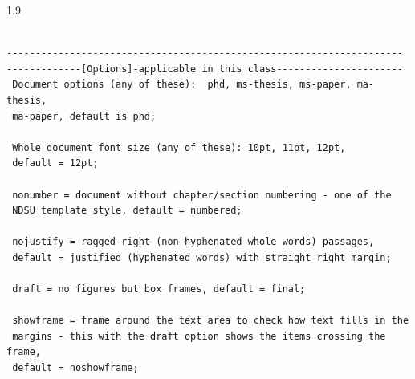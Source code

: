 \documentclass[phd]{ndsu-thesis-2022}
\newcommand\myspacing{1.9} %
\begin{document}
\begin{spacing}{\myspacing}
\begin{lstlisting}[basicstyle=\ttfamily\footnotesize\color{blue}] %or \small or \footnotesize etc.

---------------------------------------------------------------------
-------------[Options]-applicable in this class----------------------
 Document options (any of these):  phd, ms-thesis, ms-paper, ma-thesis, 
 ma-paper, default is phd; 
 
 Whole document font size (any of these): 10pt, 11pt, 12pt, 
 default = 12pt; 
 
 nonumber = document without chapter/section numbering - one of the 
 NDSU template style, default = numbered; 
 
 nojustify = ragged-right (non-hyphenated whole words) passages, 
 default = justified (hyphenated words) with straight right margin; 
 
 draft = no figures but box frames, default = final; 
 
 showframe = frame around the text area to check how text fills in the 
 margins - this with the draft option shows the items crossing the frame, 
 default = noshowframe; 
 

\end{lstlisting}
\end{spacing}
\end{document}
